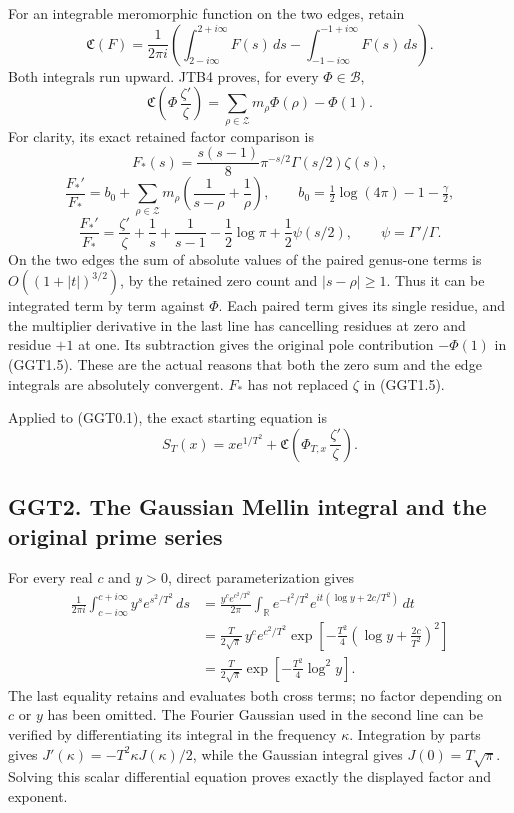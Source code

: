 For an integrable meromorphic function on the two edges, retain \[
\mathfrak C(F)=\frac1{2\pi i}
\left(\int_{2-i\infty}^{2+i\infty}F(s)\,ds
-\int_{-1-i\infty}^{-1+i\infty}F(s)\,ds\right).
\tag{GGT1.4}
\] Both integrals run upward. JTB4 proves, for every
\(\Phi\in\mathcal B\), \[
\mathfrak C\!\left(\Phi\,\frac{\zeta'}{\zeta}\right)
=\sum_{\rho\in\mathscr Z}m_\rho\Phi(\rho)-\Phi(1).
\tag{GGT1.5}
\] For clarity, its exact retained factor comparison is \[
F_*(s)=\frac{s(s-1)}8\pi^{-s/2}\Gamma(s/2)\zeta(s),
\] \[
\frac{F_*'}{F_*}
=b_0+\sum_{\rho\in\mathscr Z}m_\rho
\left(\frac1{s-\rho}+\frac1\rho\right),
\qquad b_0=\tfrac12\log(4\pi)-1-\tfrac\gamma2,
\] \[
\frac{F_*'}{F_*}
=\frac{\zeta'}{\zeta}+\frac1s+\frac1{s-1}
-\frac12\log\pi+\frac12\psi(s/2),
\qquad \psi=\Gamma'/\Gamma.
\tag{GGT1.6}
\] On the two edges the sum of absolute values of the paired genus-one
terms is \(O((1+|t|)^{3/2})\), by the retained zero count and
\(|s-\rho|\ge1\). Thus it can be integrated term by term against
\(\Phi\). Each paired term gives its single residue, and the multiplier
derivative in the last line has cancelling residues at zero and residue
\(+1\) at one. Its subtraction gives the original pole contribution
\(-\Phi(1)\) in (GGT1.5). These are the actual reasons that both the
zero sum and the edge integrals are absolutely convergent. \(F_*\) has
not replaced \(\zeta\) in (GGT1.5).

Applied to (GGT0.1), the exact starting equation is \[
S_T(x)=x e^{1/T^2}
+\mathfrak C\!\left(\Phi_{T,x}\,\frac{\zeta'}{\zeta}\right).
\tag{GGT1.7}
\]

\subsection{GGT2. The Gaussian Mellin integral and the original prime
series}\label{ggt2.-the-gaussian-mellin-integral-and-the-original-prime-series}

For every real \(c\) and \(y>0\), direct parameterization gives \[
\begin{aligned}
\frac1{2\pi i}\int_{c-i\infty}^{c+i\infty}
y^s e^{s^2/T^2}\,ds
&=\frac{y^ce^{c^2/T^2}}{2\pi}
\int_{\mathbb R}e^{-t^2/T^2}
e^{it(\log y+2c/T^2)}\,dt\\
&=\frac{T}{2\sqrt\pi}\,
y^ce^{c^2/T^2}
\exp\left[-\frac{T^2}{4}
\left(\log y+\frac{2c}{T^2}\right)^2\right]\\
&=\frac{T}{2\sqrt\pi}
\exp\left[-\frac{T^2}{4}\log^2y\right].
\end{aligned}
\tag{GGT2.1}
\] The last equality retains and evaluates both cross terms; no factor
depending on \(c\) or \(y\) has been omitted. The Fourier Gaussian used
in the second line can be verified by differentiating its integral in
the frequency \(\kappa\). Integration by parts gives
\(J'(\kappa)=-T^2\kappa J(\kappa)/2\), while the Gaussian integral gives
\(J(0)=T\sqrt\pi\). Solving this scalar differential equation proves
exactly the displayed factor and exponent.

